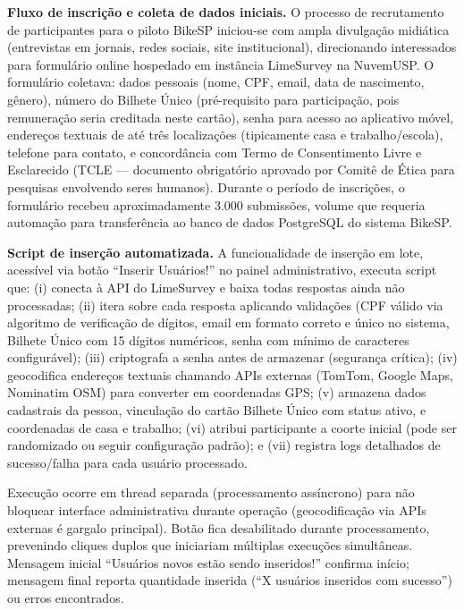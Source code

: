 

\textbf{Fluxo de inscrição e coleta de dados iniciais.} O processo de recrutamento de participantes para o piloto BikeSP iniciou-se com ampla divulgação midiática (entrevistas em jornais, redes sociais, site institucional), direcionando interessados para formulário online hospedado em instância LimeSurvey na NuvemUSP. O formulário coletava: dados pessoais (nome, CPF, email, data de nascimento, gênero), número do Bilhete Único (pré-requisito para participação, pois remuneração seria creditada neste cartão), senha para acesso ao aplicativo móvel, endereços textuais de até três localizações (tipicamente casa e trabalho/escola), telefone para contato, e concordância com Termo de Consentimento Livre e Esclarecido (TCLE --- documento obrigatório aprovado por Comitê de Ética para pesquisas envolvendo seres humanos). Durante o período de inscrições, o formulário recebeu aproximadamente 3.000 submissões, volume que requeria automação para transferência ao banco de dados PostgreSQL do sistema BikeSP.

\textbf{Script de inserção automatizada.} A funcionalidade de inserção em lote, acessível via botão ``Inserir Usuários!'' no painel administrativo, executa script que: (i) conecta à API do LimeSurvey e baixa todas respostas ainda não processadas; (ii) itera sobre cada resposta aplicando validações (CPF válido via algoritmo de verificação de dígitos, email em formato correto e único no sistema, Bilhete Único com 15 dígitos numéricos, senha com mínimo de caracteres configurável); (iii) criptografa a senha antes de armazenar (segurança crítica); (iv) geocodifica endereços textuais chamando APIs externas (TomTom, Google Maps, Nominatim OSM) para converter em coordenadas GPS; (v) armazena dados cadastrais da pessoa, vinculação do cartão Bilhete Único com status ativo, e coordenadas de casa e trabalho; (vi) atribui participante a coorte inicial (pode ser randomizado ou seguir configuração padrão); e (vii) registra logs detalhados de sucesso/falha para cada usuário processado.

Execução ocorre em thread separada (processamento assíncrono) para não bloquear interface administrativa durante operação (geocodificação via APIs externas é gargalo principal). Botão fica desabilitado durante processamento, prevenindo cliques duplos que iniciariam múltiplas execuções simultâneas. Mensagem inicial ``Usuários novos estão sendo inseridos!'' confirma início; mensagem final reporta quantidade inserida (``X usuários inseridos com sucesso'') ou erros encontrados.

